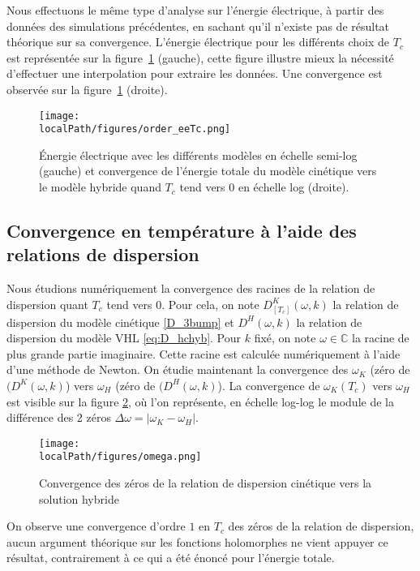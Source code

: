 Nous effectuons le même type d'analyse sur l'énergie électrique, à partir des données des simulations précédentes, en sachant qu'il n'existe pas de résultat théorique sur sa convergence. L'énergie électrique pour les différents choix de $T_c$ est représentée sur la figure~\ref{fig:limit:ee} (gauche), cette figure illustre mieux la nécessité d'effectuer une interpolation pour extraire les données. Une convergence est observée sur la figure~\ref{fig:limit:ee} (droite).
\begin{figure}[h]
  \centering
  \texttt{[image: \\localPath/figures/order\_eeTc.png]}
  \caption{Énergie électrique avec les différents modèles en échelle semi-log (gauche) et convergence de l'énergie totale du modèle cinétique vers le modèle hybride quand $T_c$ tend vers $0$ en échelle log (droite).}
  \label{fig:limit:ee}
\end{figure}

\FloatBarrier

\subsection{Convergence en température à l'aide des relations de dispersion}

Nous étudions numériquement la convergence des racines de la relation de dispersion quant $T_c$ tend vers $0$. Pour cela, on note $D^K_{[T_c]}(\omega,k)$ la relation de dispersion du modèle cinétique \eqref{D_3bump} et $D^H(\omega,k)$ la relation de dispersion du modèle VHL \eqref{eq:D_hchyb}. Pour $k$ fixé, on note $\omega\in\mathbb{C}$ la racine de plus grande partie imaginaire. 
Cette racine est calculée numériquement à l'aide d'une méthode de Newton. On étudie maintenant la convergence des $\omega_K$ (zéro de $(D^K(\omega,k)$) vers $\omega_H$ (zéro de $(D^H(\omega,k)$). La convergence de $\omega_K(T_c)$ vers $\omega_H$ est visible sur la figure \ref{fig:omega}, où l'on représente, en échelle log-log le module de la différence des 2 zéros $\Delta \omega = |\omega_K-\omega_H|$.
\begin{figure}[h!]
  \centering
  \texttt{[image: \\localPath/figures/omega.png]}
  \caption{Convergence des zéros de la relation de dispersion cinétique vers la solution hybride}
  \label{fig:omega}
\end{figure}
On observe une convergence d'ordre $1$ en $T_c$ des zéros de la relation de dispersion, aucun argument théorique sur les fonctions holomorphes ne vient appuyer ce résultat, contrairement à ce qui a été énoncé pour l'énergie totale.

